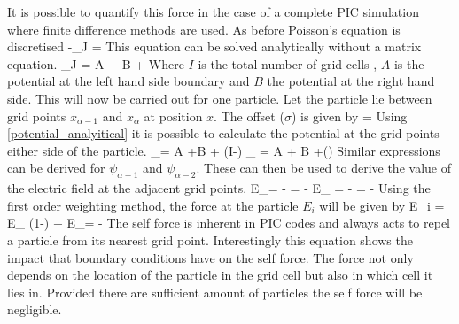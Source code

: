 It is possible to quantify this force in the case of a complete PIC simulation where finite difference methods are used. As before Poisson's equation is discretised 
\be 
-\rho_J = 
\ee 
This equation can be solved analytically without a matrix equation.
\be 
\psi_J =  A +  B +  \left[(I-J) \sum\limits_{k=1}^J k\rho_k   + J \sum\limits_{k=J+1}^{I-1} (I-k)\rho_k \right]
\label{potential_analyitical}
\ee
Where $I$ is the total number of grid cells , $A$ is the potential at the left hand side boundary and $B$ the potential at the right hand side. 
This will now be carried out for one particle. Let the particle lie between grid points $x_{\alpha -1}$ and $x_\alpha$ at position $x$. The offset ($\sigma$) is given by 
\be 
\sigma = 
\ee
Using \eqref{potential_analyitical} it is possible to calculate the potential at the grid points either side of the particle. 
\be
\psi_\alpha  = A +B + (I-\alpha) 
\ee
\be 
\psi_{} = A +  B +()  
\ee
Similar expressions can be derived for $\psi_{\alpha+1}$ and $\psi_{\alpha-2}$. These can then be used to derive the value of the electric field at the adjacent grid points. 
\be 
E_\alpha = -  =  - 
\ee 
\be 
E_{} = -  =  -   
\ee
Using the first order weighting method, the force at the particle $E_i$ will be given by 
\be 
E_i = E_{ } (1-\sigma) + \sigma E_\alpha =  -  
\ee
The self force is inherent in PIC codes and always acts to repel a particle from its nearest grid point. Interestingly this equation shows the impact that boundary conditions have on the self force. The force not only depends on the location of the particle in the grid cell but also in which cell it lies in. Provided there are sufficient amount of particles the self force will be negligible.







